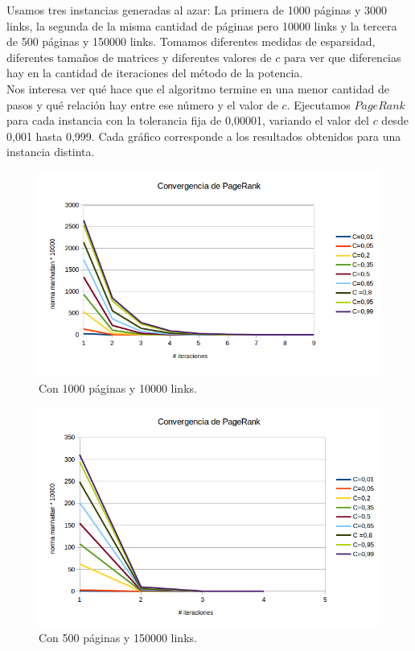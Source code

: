 Usamos tres instancias generadas al azar: La primera de 1000 páginas y 3000 links, la segunda de la misma cantidad de páginas pero 10000 links y la tercera de 500 páginas y 150000 links. Tomamos diferentes medidas de esparsidad, diferentes tamaños de matrices y diferentes valores de $c$ para ver que diferencias hay en la cantidad de iteraciones del método de la potencia.\\

Nos interesa ver qué hace que el algoritmo termine en una menor cantidad de pasos y qué relación hay entre ese número y el valor de $c$. Ejecutamos $PageRank$ para cada instancia con la tolerancia fija de 0,00001, variando el valor del $c$ desde 0,001 hasta 0,999. Cada gráfico corresponde a los resultados obtenidos para una instancia distinta.\\



\begin{figure}[h]
  \begin{center}
    \includegraphics[scale= 0.6]{imagenes/convergencia2.png}
     \caption{Con 1000 páginas y 10000 links.}
  \end{center}
  \label{fig:img4}
\end{figure}



\begin{figure}[h]
  \vspace{-20pt}
  \begin{center}
    \includegraphics[scale= 0.6]{imagenes/convergencia3.png}
  \end{center}
   \caption{Con 500 páginas y 150000 links.}
  \label{fig:img5}
\end{figure}

